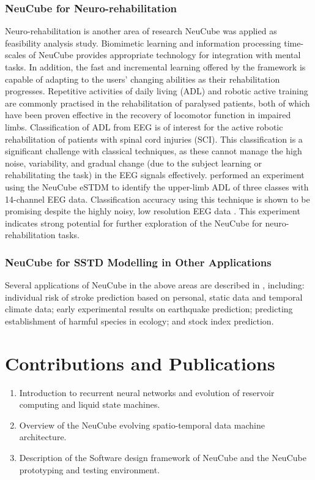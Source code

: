 \subsubsection{NeuCube for Neuro-rehabilitation}

Neuro-rehabilitation is another area of research NeuCube was applied as feasibility analysis study. Biomimetic learning and information processing time-scales of NeuCube provides appropriate technology for integration with mental tasks. In addition, the fast and incremental learning offered by the framework is capable of adapting to the users' changing abilities as their rehabilitation progresses. Repetitive activities of daily living (ADL) and robotic active training are commonly practised in the rehabilitation of paralysed patients, both of which have been proven effective in the recovery of locomotor function in impaired limbs. Classification of ADL from EEG is of interest for the active robotic rehabilitation of patients with spinal cord injuries (SCI). This classification is a significant challenge with classical techniques, as these cannot manage the high noise, variability, and gradual change (due to the subject learning or rehabilitating the task) in the EEG signals effectively. \citet{hu2014eeg} performed an experiment using the NeuCube eSTDM to identify the upper-limb ADL of three classes with 14-channel EEG data. Classification accuracy using this technique is shown to be promising despite the highly noisy, low resolution EEG data \citep{hu2014eeg}. This experiment indicates strong potential for further exploration of the  NeuCube for neuro-rehabilitation tasks.

\subsubsection{NeuCube for SSTD Modelling in Other Applications}
Several applications of NeuCube in the above areas are described in \citep{kasabov2016evolving, doborjeh2018from}, including: individual risk of stroke prediction based on personal, static data and temporal climate data; early experimental results on earthquake prediction; predicting establishment of harmful species in ecology; and stock index prediction.




\pagebreak
\section{Contributions and Publications}
\begin{tcolorbox}[colback=black!5,colframe=black!40!black,title=Contributions]
	\itshape
	\begin{enumerate}
		\item Introduction to recurrent neural networks and evolution of reservoir computing and liquid state machines.
		\item Overview of the NeuCube evolving spatio-temporal data machine architecture.
		\item Description of the Software design framework of NeuCube and the NeuCube prototyping and testing environment. 
	\end{enumerate}
\end{tcolorbox}

